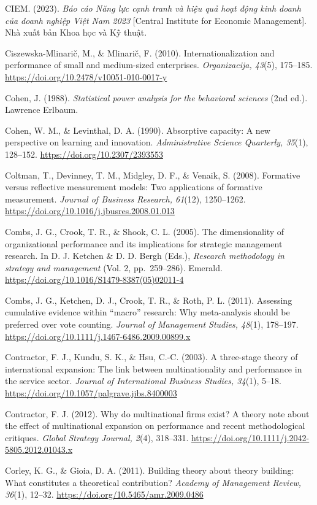 \documentclass[
  a4paper,
  13pt]{extreport}
\begin{document}
CIEM. (2023). \emph{Báo cáo Năng lực cạnh tranh và hiệu quả hoạt động
kinh doanh của doanh nghiệp Việt Nam 2023} {[}Central Institute for
Economic Management{]}. Nhà xuất bản Khoa học và Kỹ thuật.

Ciszewska-Mlinarič, M., \& Mlinarič, F. (2010). Internationalization and
performance of small and medium-sized enterprises. \emph{Organizacija,
43}(5), 175--185. \url{https://doi.org/10.2478/v10051-010-0017-y}

Cohen, J. (1988). \emph{Statistical power analysis for the behavioral
sciences} (2nd ed.). Lawrence Erlbaum.

Cohen, W. M., \& Levinthal, D. A. (1990). Absorptive capacity: A new
perspective on learning and innovation. \emph{Administrative Science
Quarterly, 35}(1), 128--152. \url{https://doi.org/10.2307/2393553}

Coltman, T., Devinney, T. M., Midgley, D. F., \& Venaik, S. (2008).
Formative versus reflective measurement models: Two applications of
formative measurement. \emph{Journal of Business Research, 61}(12),
1250--1262. \url{https://doi.org/10.1016/j.jbusres.2008.01.013}

Combs, J. G., Crook, T. R., \& Shook, C. L. (2005). The dimensionality
of organizational performance and its implications for strategic
management research. In D. J. Ketchen \& D. D. Bergh (Eds.),
\emph{Research methodology in strategy and management} (Vol. 2,
pp.~259--286). Emerald.
\url{https://doi.org/10.1016/S1479-8387(05)02011-4}

Combs, J. G., Ketchen, D. J., Crook, T. R., \& Roth, P. L. (2011).
Assessing cumulative evidence within ``macro'' research: Why
meta-analysis should be preferred over vote counting. \emph{Journal of
Management Studies, 48}(1), 178--197.
\url{https://doi.org/10.1111/j.1467-6486.2009.00899.x}

Contractor, F. J., Kundu, S. K., \& Hsu, C.-C. (2003). A three-stage
theory of international expansion: The link between multinationality and
performance in the service sector. \emph{Journal of International
Business Studies, 34}(1), 5--18.
\url{https://doi.org/10.1057/palgrave.jibs.8400003}

Contractor, F. J. (2012). Why do multinational firms exist? A theory
note about the effect of multinational expansion on performance and
recent methodological critiques. \emph{Global Strategy Journal, 2}(4),
318--331. \url{https://doi.org/10.1111/j.2042-5805.2012.01043.x}

Corley, K. G., \& Gioia, D. A. (2011). Building theory about theory
building: What constitutes a theoretical contribution? \emph{Academy of
Management Review, 36}(1), 12--32.
\url{https://doi.org/10.5465/amr.2009.0486}
\end{document}
